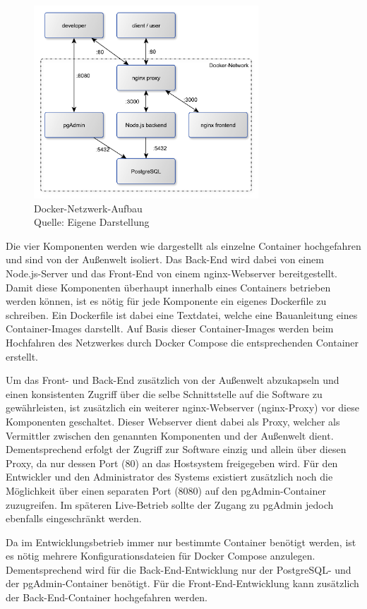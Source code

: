 \begin{figure}[H]
	\centering
	\includegraphics[width=0.75\textwidth]{img/implementierung/network.pdf}
	\captionsetup{justification=centering, format=plain}
	\caption[Docker-Netzwerk-Aufbau]{Docker-Netzwerk-Aufbau \\Quelle: Eigene Darstellung}
	\label{fig:implementierung:docker}
\end{figure}

Die vier Komponenten werden wie dargestellt als einzelne Container hochgefahren und sind von der Außenwelt isoliert. 
Das Back-End wird dabei von einem Node.js-Server und das Front-End von einem nginx-Webserver bereitgestellt.
Damit diese Komponenten überhaupt innerhalb eines Containers betrieben werden können, ist es nötig für jede Komponente ein eigenes Dockerfile zu schreiben.
Ein Dockerfile ist dabei eine Textdatei, welche eine Bauanleitung eines Container-Images darstellt.
Auf Basis dieser Container-Images werden beim Hochfahren des Netzwerkes durch Docker Compose die entsprechenden Container erstellt.

Um das Front- und Back-End zusätzlich von der Außenwelt abzukapseln und einen konsistenten Zugriff über die selbe Schnittstelle auf die Software zu gewährleisten, ist zusätzlich ein weiterer nginx-Webserver (nginx-Proxy) vor diese Komponenten geschaltet.
Dieser Webserver dient dabei als Proxy, welcher als Vermittler zwischen den genannten Komponenten und der Außenwelt dient.
Dementsprechend erfolgt der Zugriff zur Software einzig und allein über diesen Proxy, da nur dessen Port (80) an das Hostsystem freigegeben wird.
Für den Entwickler und den Administrator des Systems existiert zusätzlich noch die Möglichkeit über einen separaten Port (8080) auf den pgAdmin-Container zuzugreifen. 
Im späteren Live-Betrieb sollte der Zugang zu pgAdmin jedoch ebenfalls eingeschränkt werden.

Da im Entwicklungsbetrieb immer nur bestimmte Container benötigt werden, ist es nötig mehrere Konfigurationsdateien für Docker Compose anzulegen.
Dementsprechend wird für die Back-End-Entwicklung nur der PostgreSQL- und der pgAdmin-Container benötigt.
Für die Front-End-Entwicklung kann zusätzlich der Back-End-Container hochgefahren werden.
